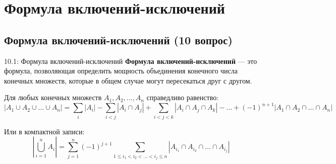 \documentclass[a4paper,12pt]{article}
\begin{document}
	\begin{center}
	\end{center}
		
	
	
	
	
	
	
	
	
	
	\newpage
	\section{Формула включений-исключений}
	
	\subsection{Формула включений-исключений (10 вопрос)}
	
	\begin{definitionbox}{10.1: Формула включений-исключений}
		\textbf{Формула включений-исключений} — это формула, позволяющая определить мощность объединения конечного числа конечных множеств, которые в общем случае могут пересекаться друг с другом.
		
		Для любых конечных множеств $A_1, A_2, \dots, A_n$ справедливо равенство:
		\[ |A_1 \cup A_2 \cup \dots \cup A_n| = \sum_{i} |A_i| - \sum_{i < j} |A_i \cap A_j| + \sum_{i < j < k} |A_i \cap A_j \cap A_k| - \dots + (-1)^{n+1} |A_1 \cap A_2 \cap \dots \cap A_n| \]
		
		Или в компактной записи:
		\[ \left|\bigcup_{i=1}^n A_i\right| = \sum_{j=1}^n (-1)^{j+1} \sum_{1 \le i_1 < i_2 < \dots < i_j \le n} |A_{i_1} \cap A_{i_2} \cap \dots \cap A_{i_j}| \]
	\end{definitionbox}
	
\end{document}
